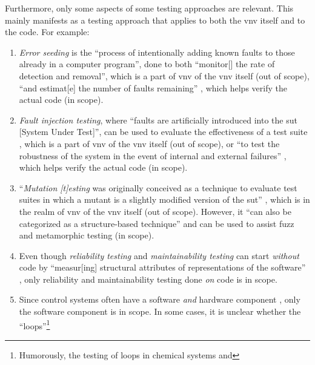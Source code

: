 Furthermore, only some aspects of some testing approaches are relevant. This
mainly manifests as a testing approach that applies to both the \acs{vnv} itself
and to the code. For example:

\begin{enumerate}
    \item \emph{Error seeding} is the ``process of intentionally adding
          known faults to those already in a computer program'',
          done to both ``monitor[] the rate of detection and removal'',
          which is a part of \acs{vnv} of the \acs{vnv} itself (out of scope),
          ``and estimat[e] the number of faults remaining''
          \citep[p.~165]{IEEE2017}, which helps verify the actual code (in scope).
    \item \emph{Fault injection testing}, where ``faults are artificially
          introduced into the \acs{sut} [System Under Test]'', can be used to
          evaluate the effectiveness of a test suite \citep[p.~5-18]{SWEBOK2024},
          which is a part of \acs{vnv} of the \acs{vnv} itself (out of scope),
          or ``to test
          the robustness of the system in the event of internal and
          external failures'' \citep[p.~42]{IEEE2022}, which helps verify
          the actual code (in scope).
    \item ``\emph{Mutation [t]esting} was originally conceived as a
          technique to evaluate test suites in which a mutant is a slightly
          modified version of the \acs{sut}'' \citep[p.~5-15]{SWEBOK2024},
          which is in the realm of \acs{vnv} of the \acs{vnv} itself (out of
          scope). However, it ``can also be categorized as a structure-based
          technique'' and can be used to assist fuzz and metamorphic testing
          \citep[p.~5-15]{SWEBOK2024} (in scope).
          \ifnotpaper
    \item Even though \emph{reliability testing} and \emph{maintainability
              testing} can start \emph{without} code by ``measur[ing]
          structural attributes of representations of the software''
          \citep[p.~18]{FentonAndPfleeger1997}, only reliability and
          maintainability testing done \emph{on} code is in scope.
    \item Since control systems often have a software \emph{and} hardware
          component \citep{ISO2015, PreußeEtAl2012,ForsythEtAl2004},
          only the software component is in scope. In some cases, it is
          unclear whether the ``loops''\footnote{Humorously, the testing of
              loops in chemical systems \citep{Dominguez-PumarEtAl2020} and
}
\end{enumerate}
